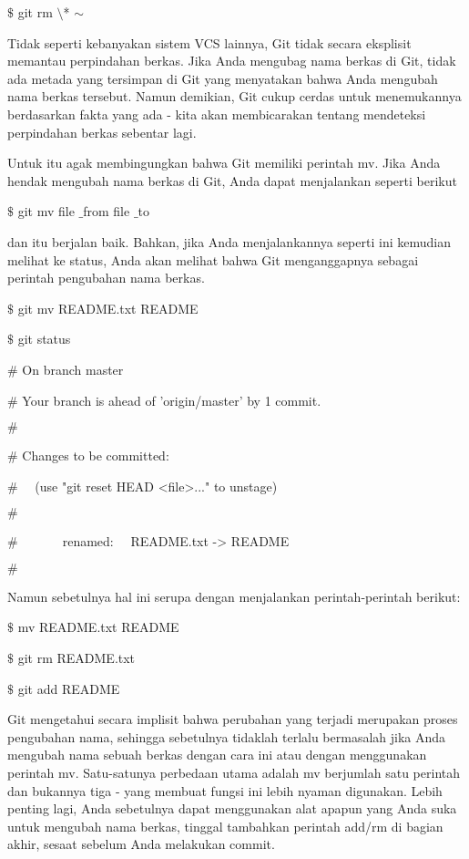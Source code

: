 \noindent 
 $  \$  $ git rm  $  \setminus  $* $  \sim  $ \par
\noindent 
Tidak seperti kebanyakan sistem VCS lainnya, Git tidak secara eksplisit memantau perpindahan berkas. Jika Anda mengubag nama berkas di Git, tidak ada metada yang tersimpan di Git yang menyatakan bahwa Anda mengubah nama berkas tersebut. Namun demikian, Git cukup cerdas untuk menemukannya berdasarkan fakta yang ada - kita akan membicarakan tentang mendeteksi perpindahan berkas sebentar lagi. \par
\noindent 
Untuk itu agak membingungkan bahwa Git memiliki perintah mv. Jika Anda hendak mengubah nama berkas di Git, Anda dapat menjalankan seperti berikut \par
\noindent 
 $  \$  $ git mv file $  \_  $from file $  \_  $to \par
\noindent 
dan itu berjalan baik. Bahkan, jika Anda menjalankannya seperti ini kemudian melihat ke status, Anda akan melihat bahwa Git menganggapnya sebagai perintah pengubahan nama berkas.  \par
\noindent 
 $  \$  $ git mv README.txt README \par
\noindent 
 $  \$  $ git status \par
\noindent 
 $  \#  $ On branch master \par
\noindent 
 $  \#  $ Your branch is ahead of 'origin/master' by 1 commit. \par
\noindent 
 $  \#  $ \par
\noindent 
 $  \#  $ Changes to be committed: \par
\noindent 
 $  \#  $~~ (use "git reset HEAD <file>..." to unstage) \par
\noindent 
 $  \#  $ \par
\noindent 
 $  \#  $~~~~~~~renamed:~~  README.txt -> README \par
\noindent 
 $  \#  $ \par
\noindent 
Namun sebetulnya hal ini serupa dengan menjalankan perintah-perintah berikut: \par
\noindent 
 $  \$  $ mv README.txt README \par
\noindent 
 $  \$  $ git rm README.txt \par
\noindent 
 $  \$  $ git add README \par
\noindent 
Git mengetahui secara implisit bahwa perubahan yang terjadi merupakan proses pengubahan nama, sehingga sebetulnya tidaklah terlalu bermasalah jika Anda mengubah nama sebuah berkas dengan cara ini atau dengan menggunakan perintah mv. Satu-satunya perbedaan utama adalah mv berjumlah satu perintah dan bukannya tiga - yang membuat fungsi ini lebih nyaman digunakan. Lebih penting lagi, Anda sebetulnya dapat menggunakan alat apapun yang Anda suka untuk mengubah nama berkas, tinggal tambahkan perintah add/rm di bagian akhir, sesaat sebelum Anda melakukan commit. \par
\vspace{12pt}
\vspace{12pt}
\vspace{12pt}
\vspace{12pt}
